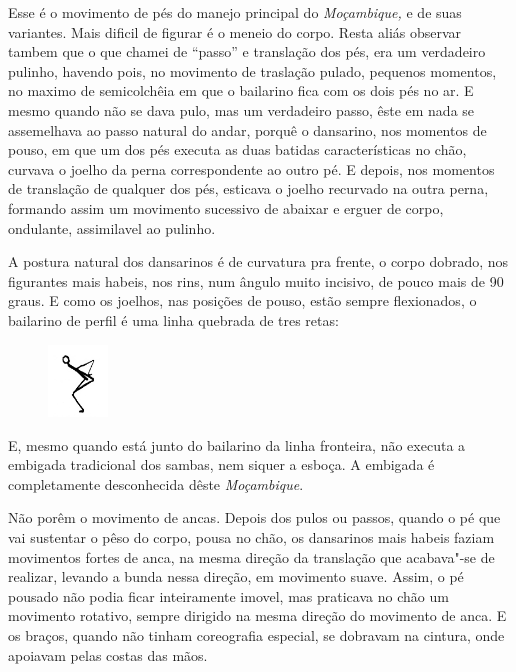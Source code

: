 Esse é o movimento de pés do manejo principal do \emph{Moçambique,} e de
suas variantes. Mais dificil de figurar é o meneio do corpo. Resta aliás
observar tambem que o que chamei de ``passo'' e translação dos pés, era
um verdadeiro pulinho, havendo pois, no movimento de traslação pulado,
pequenos momentos, no maximo de semicolchêia em que o bailarino fica com
os dois pés no ar. E mesmo quando não se dava pulo, mas um verdadeiro
passo, êste em nada se assemelhava ao passo natural do andar, porquê o
dansarino, nos momentos de pouso, em que um dos pés executa as duas
batidas características no chão, curvava o joelho da perna
correspondente ao outro pé. E depois, nos momentos de translação de
qualquer dos pés, esticava o joelho recurvado na outra perna, formando
assim um movimento sucessivo de abaixar e erguer de corpo, ondulante,
assimilavel ao pulinho.

A postura natural dos dansarinos é de curvatura pra frente, o corpo
dobrado, nos figurantes mais habeis, nos rins, num ângulo muito
incisivo, de pouco mais de 90 graus. E como os joelhos, nas posições de
pouso, estão sempre flexionados, o bailarino de perfil é uma linha
quebrada de tres retas:

\begin{figure}[!ht]
\centering
 \includegraphics[width=16mm]{./imgs/img4.png}
\end{figure}

E, mesmo quando está junto do bailarino da linha fronteira, não executa
a embigada tradicional dos sambas, nem siquer a esboça. A embigada é
completamente desconhecida dêste \emph{Moçambique}.

Não porêm o movimento de ancas. Depois dos pulos ou passos, quando o pé
que vai sustentar o pêso do corpo, pousa no chão, os dansarinos mais
habeis faziam movimentos fortes de anca, na mesma direção da translação
que acabava"-se de realizar, levando a bunda nessa direção, em movimento
suave. Assim, o pé pousado não podia ficar inteiramente imovel, mas
praticava no chão um movimento rotativo, sempre dirigido na mesma
direção do movimento de anca. E os braços, quando não tinham coreografia
especial, se dobravam na cintura, onde apoiavam pelas costas das mãos.

